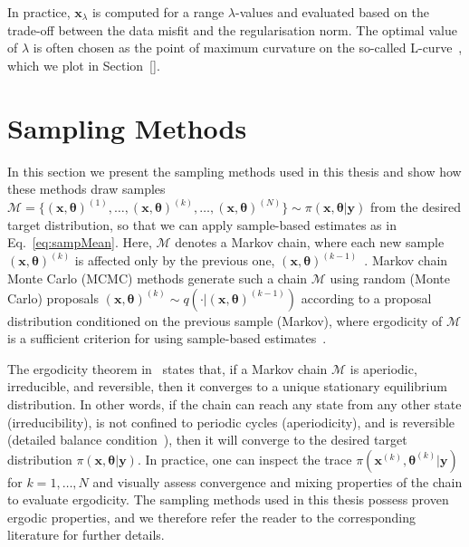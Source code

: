 In practice, $\bm{x}_{\lambda}$ is computed for a range $\lambda$-values and evaluated based on the trade-off between the data misfit and the regularisation norm. The optimal value of $\lambda$ is often chosen as the point of maximum curvature on the so-called L-curve~\cite{hansen1993use}, which we plot in Section~\ref{}.



\section{Sampling Methods}
\label{sec:sampling}

In this section we present the sampling methods used in this thesis and show how these methods draw samples $ \mathcal{M} = \{ (\bm{x}, \bm{\theta} )^{(1)}, \dots, (\bm{x}, \bm{\theta} )^{(k)}, \dots, (\bm{x}, \bm{\theta})^{(N)} \} \sim \pi(\bm{x}, \bm{\theta} |  \bm{y})$ from the desired target distribution, so that we can apply sample-based estimates as in Eq.~\ref{eq:sampMean}.
Here, $\mathcal{M}$ denotes a Markov chain, where each new sample $(\bm{x}, \bm{\theta})^{(k)}$ is affected only by the previous one, $(\bm{x}, \bm{\theta})^{(k-1)}$~\cite{}.
Markov chain Monte Carlo (MCMC) methods generate such a chain $\mathcal{M}$ using random (Monte Carlo) proposals $(\bm{x}, \bm{\theta})^{(k)} \sim q( \cdot |  (\bm{x}, \bm{\theta})^{(k-1)})$ according to a proposal distribution conditioned on the previous sample (Markov), where ergodicity of $\mathcal{M}$ is a sufficient criterion for using sample-based estimates~\cite{tan2016LecNot, roberts2004general}.

The ergodicity theorem in~\cite{tan2016LecNot} states that, if a Markov chain $\mathcal{M}$ is aperiodic, irreducible, and reversible, then it converges to a unique stationary equilibrium distribution.
In other words, if the chain can reach any state from any other state (irreducibility), is not confined to periodic cycles (aperiodicity), and is reversible (detailed balance condition~\cite{tan2016LecNot}), then it will converge to the desired target distribution $\pi(\bm{x}, \bm{\theta} |  \bm{y})$.
In practice, one can inspect the trace $\pi(\bm{x}^{(k)}, \bm{\theta}^{(k)} |  \bm{y})$ for $k = 1, \dots, N$ and visually assess convergence and mixing properties of the chain to evaluate ergodicity.
The sampling methods used in this thesis possess proven ergodic properties, and we therefore refer the reader to the corresponding literature for further details.


